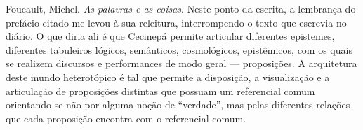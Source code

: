Foucault, Michel. \textit{As palavras e as coisas}.
Neste ponto da escrita, a lembrança do prefácio citado me levou à sua releitura, interrompendo o texto que escrevia no diário. O que diria ali é que Cecinepá permite articular diferentes epistemes, diferentes tabuleiros lógicos, semânticos, cosmológicos, epistêmicos, com os quais se realizem discursos e performances de modo geral --- proposições. A arquitetura deste mundo heterotópico é tal que permite a disposição, a visualização e a articulação de proposições distintas que possuam um referencial comum orientando-se não por alguma noção de \enquote{verdade}, mas pelas diferentes relações que cada proposição encontra com o referencial comum.